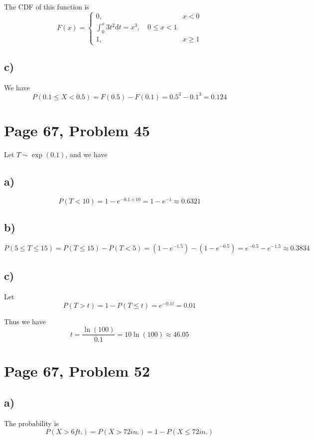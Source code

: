 \documentclass[a4paper, UTF-8]{article}
\theoremstyle{plain}
\begin{document}
The CDF of this function is 
$$
F(x) = \begin{cases} 
    0, & x < 0 \\
    \int_{0}^x 3t^2 \mathrm{d}t = x^3, \quad 0 \leq x < 1 \\ 
    1, & x \geq 1
\end{cases}
$$

\subsection{c)}

We have 
$$
P(0.1 \leq X < 0.5) = F(0.5) - F(0.1) = 0.5^3 - 0.1^3 = 0.124
$$

\section{Page 67, Problem 45}

Let $T \sim \exp(0.1)$, and we have 

\subsection{a)} 

$$
P(T < 10) = 1 - e^{-0.1 \times 10} = 1 - e^{-1} \approx 0.6321
$$

\subsection{b)} 

$$
P(5 \leq T \leq 15) = P(T \leq 15) - P(T < 5) = (1 - e^{-1.5}) - (1 - e^{-0.5}) = e^{-0.5} - e^{-1.5} \approx 0.3834
$$

\subsection{c)} 

Let
$$
P(T > t) = 1 - P(T \leq t) = e^{-0.1t} = 0.01
$$

Thus we have 
$$
t = \frac{\ln(100)}{0.1} = 10\ln(100) \approx 46.05
$$

\section{Page 67, Problem 52}

\subsection{a)}

The probability is 
$$
P(X > 6 ft.) = P(X > 72 in.) = 1 - P(X \leq 72 in.)
$$
\end{document}
